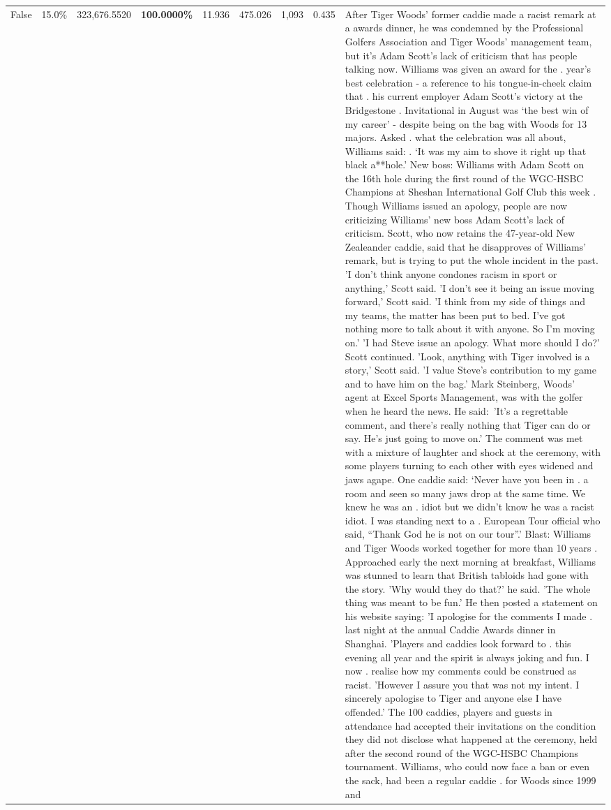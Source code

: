 \begin{table}[H]
\begin{tabular}{lllrlllll}
False & 15.0\% & 323,676.5520 & \bfseries \color{red} 100.0000\% & 11.936 & 475.026 & 1,093 & 0.435 & After Tiger Woods' former caddie made a racist remark at a awards dinner, he was condemned by the Professional Golfers Association and Tiger Woods' management team, but it's Adam Scott's lack of criticism that has people talking now. Williams was given an award for the . year’s best celebration - a reference to his tongue-in-cheek claim that . his current employer Adam Scott’s victory at the Bridgestone . Invitational in August was ‘the best win of my career’ - despite being on the bag with Woods for 13 majors. Asked . what the celebration was all about, Williams said: . ‘It was my aim to shove it right up that black a**hole.’ New boss: Williams with Adam Scott  on the 16th hole during the first round of the WGC-HSBC Champions at Sheshan International Golf Club this week . Though Williams issued an apology, people are now criticizing Williams' new boss Adam Scott's lack of criticism. Scott, who now retains the 47-year-old New Zealeander caddie, said that he disapproves of Williams' remark, but is trying to put the whole incident in the past. 'I don't think anyone condones racism in sport or anything,' Scott said. 'I don't see it being an issue moving forward,' Scott said. 'I think from my side of things and my teams, the matter has been put to bed. I've got nothing more to talk about it with anyone. So I'm moving on.' 'I had Steve issue an apology. What more should I do?' Scott continued. 'Look, anything with Tiger involved is a story,' Scott said. 'I value Steve's contribution to my game and to have him on the bag.' Mark Steinberg, Woods' agent at Excel Sports Management, was with the golfer when he heard the news. He said: 'It's a regrettable comment, and there's really nothing that Tiger can do or say. He's just going to move on.' The comment was met with a mixture of laughter and shock at the ceremony, with some players turning to each other with eyes widened and jaws agape. One caddie said: ‘Never have you been in . a room and seen so many jaws drop at the same time. We knew he was an . idiot but we didn’t know he was a racist idiot. I was standing next to a . European Tour official who said, “Thank God he is not on our tour”.’ Blast: Williams and Tiger Woods worked together for more than 10 years . Approached early the next morning at breakfast, Williams was stunned to learn that British tabloids had gone with the story. 'Why would they do that?' he said. 'The whole thing was meant to be fun.' He then posted a statement on his website saying: 'I apologise for the comments I made . last night at the annual Caddie Awards dinner in Shanghai. 'Players and caddies look forward to . this evening all year and the spirit is always joking and fun. I now . realise how my comments could be construed as racist. 'However I assure you that was not my intent. I sincerely apologise to Tiger and anyone else I have offended.' The 100 caddies, players and guests in attendance had accepted their invitations on the condition they did not disclose what happened at the ceremony, held after the second round of the WGC-HSBC Champions tournament. Williams, who could now face a ban or even the sack, had been a regular caddie . for Woods since 1999 and 
\end{tabular}
\end{table}
